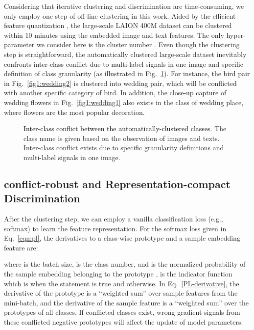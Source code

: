 \documentclass{article} \usepackage{iclr2023_conference,times}
\def\laion{LAION 400M dataset}
\begin{document}
Considering that iterative clustering and discrimination are time-consuming, we only employ one step of off-line clustering in this work. Aided by the efficient feature quantization \citep{johnson2019billion}, the large-scale \laion{} can be clustered within 10 minutes using the embedded image and text features. 
The only hyper-parameter we consider here is the cluster number . Even though the clustering step is straightforward, the automatically clustered large-scale dataset inevitably confronts inter-class conflict due to multi-label signals in one image and specific definition of class granularity (as illustrated in Fig.~\ref{fig1:clutering}). 
For instance, the bird pair in Fig.~\ref{fig1:wedding2} is clustered into wedding pair, which will be conflicted with another specific category of bird. In addition, the close-up capture of wedding flowers in Fig.~\ref{fig1:wedding1} also exists in the class of wedding place, where flowers are the most popular decoration. 


\begin{figure}
\centering

\caption{\textcolor{black}{Inter-class conflict between the automatically-clustered classes}. The class name is given based on the observation of images and texts. Inter-class conflict exists due to specific granularity definitions and multi-label signals in one image.}
\vspace{-4mm}
\label{fig1:clutering}
\end{figure}


\subsection{conflict-robust and Representation-compact Discrimination}
After the clustering step, we can employ a vanilla classification loss (e.g., softmax) to learn the feature representation. 
For the softmax loss given in Eq.~\ref{eqn:pl}, the derivatives to a class-wise prototype  and a sample embedding feature  are:
\vspace{-2mm}

where  is the batch size,  is the class number, and  is the normalized probability of the sample embedding  belonging to the prototype ,  is the indicator function which is  when the statement is true and  otherwise. 
In Eq.~\ref{PL-derivative}, the derivative of the prototype is a ``weighted sum'' over sample features from the mini-batch, and the derivative of the sample feature is a ``weighted sum'' over the prototypes of all classes. 
If conflicted classes exist, wrong gradient signals from these conflicted negative prototypes will affect the update of model parameters. 
\end{document}
